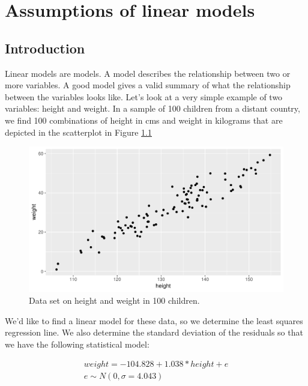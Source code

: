 \documentclass[]{report}\usepackage[]{graphicx}\usepackage[]{color}
\makeatletter
\def\maxwidth{ %
  \ifdim\Gin@nat@width>\linewidth
    \linewidth
  \else
    \Gin@nat@width
  \fi
}
\newenvironment{knitrout}{}{} %
\makeatother
\begin{document}
\chapter{Assumptions of linear models}\label{chap:assumptions}


\section{Introduction}
Linear models are models. A model describes the relationship between two or more variables. A good model gives a valid summary of what the relationship between the variables looks like. Let's look at a very simple example of two variables: height and weight. In a sample of 100 children from a distant country, we find 100 combinations of height in cms and weight in kilograms that are depicted in the scatterplot in Figure \ref{fig:ass_1}

\begin{knitrout}
\color{fgcolor}\begin{figure}

{\centering \includegraphics[width=\maxwidth]{figure/ass_1-1} 

}

\caption[Data set on height and weight in 100 children]{Data set on height and weight in 100 children.}\label{fig:ass_1}
\end{figure}


\end{knitrout}

We'd like to find a linear model for these data, so we determine the least squares regression line. We also determine the standard deviation of the residuals so that we have the following statistical model:

\begin{eqnarray}
weight = -104.828 + 1.038* height + e \\
e \sim N(0, \sigma = 4.043) 
\end{eqnarray}
\end{document}
